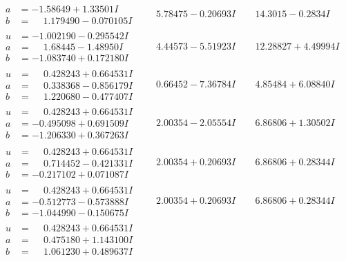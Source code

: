 \documentclass[1p]{elsarticle_modified}
\theoremstyle{definition}
\begin{document}
$$\begin{array}{c|c|c}
\begin{aligned}
a &= -1.58649 + 1.33501 I \\
b &= \phantom{-}1.179490 - 0.070105 I\end{aligned}
 & \phantom{-}5.78475 - 0.20693 I & \phantom{-}14.3015 - 0.2834 I \\ \hline\begin{aligned}
u &= -1.002190 - 0.295542 I \\
a &= \phantom{-}1.68445 - 1.48950 I \\
b &= -1.083740 + 0.172180 I\end{aligned}
 & \phantom{-}4.44573 - 5.51923 I & \phantom{-}12.28827 + 4.49994 I \\ \hline\begin{aligned}
u &= \phantom{-}0.428243 + 0.664531 I \\
a &= \phantom{-}0.338368 - 0.856179 I \\
b &= \phantom{-}1.220680 - 0.477407 I\end{aligned}
 & \phantom{-}0.66452 - 7.36784 I & \phantom{-}4.85484 + 6.08840 I \\ \hline\begin{aligned}
u &= \phantom{-}0.428243 + 0.664531 I \\
a &= -0.495098 + 0.691509 I \\
b &= -1.206330 + 0.367263 I\end{aligned}
 & \phantom{-}2.00354 - 2.05554 I & \phantom{-}6.86806 + 1.30502 I \\ \hline\begin{aligned}
u &= \phantom{-}0.428243 + 0.664531 I \\
a &= \phantom{-}0.714452 - 0.421331 I \\
b &= -0.217102 + 0.071087 I\end{aligned}
 & \phantom{-}2.00354 + 0.20693 I & \phantom{-}6.86806 + 0.28344 I \\ \hline\begin{aligned}
u &= \phantom{-}0.428243 + 0.664531 I \\
a &= -0.512773 - 0.573888 I \\
b &= -1.044990 - 0.150675 I\end{aligned}
 & \phantom{-}2.00354 + 0.20693 I & \phantom{-}6.86806 + 0.28344 I \\ \hline\begin{aligned}
u &= \phantom{-}0.428243 + 0.664531 I \\
a &= \phantom{-}0.475180 + 1.143100 I \\
b &= \phantom{-}1.061230 + 0.489637 I\end{aligned}

\end{array}$$
\end{document}
